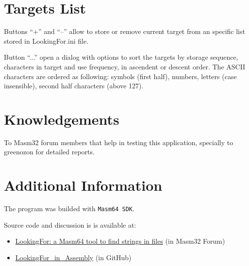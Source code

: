 \documentclass[11pt,a4paper,numbers=enddot]{scrartcl}
\begin{document}
\hypertarget{targets}{}\section {Targets List} 
	
	Buttons ``+'' and ``--'' allow to store or remove current target from an specific list stored in LookingFor.ini file. 
	
	Button ``...'' open a dialog with options to sort the targets by storage sequence, characters in target and use frequency, in ascendent or descent order. The ASCII characters are ordered as following: symbols (first half), numbers, letters (case insensible), second half characters (above 127). 
	
	
\section{Knowledgements}

	To Masm32 forum members that help in testing this application, specially to greenozon for detailed reports.

\section{Additional Information}

	The program was builded with \verb$Masm64 SDK$.

	Source code and discussion is is available at:
    \begin{itemize}
	
	\item \href{https://masm32.com/board/index.php?topic=11888.0}{LookingFor: a Masm64 tool to find strings in files} (in Masm32 Forum) 
	\item \href{https://github.com/ASMHSE/LookingFor-in-Assembly}{LookingFor\_in\_Assembly} (in GitHub) 
     \end{itemize}
	
\end{document}
